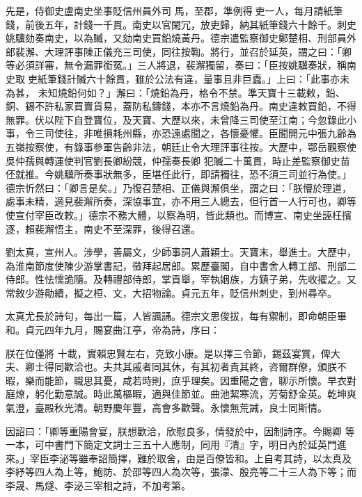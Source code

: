 \begin{pinyinscope}
 先是，侍御史盧南史坐事貶信州員外司
 馬，至郡，準例得吏一人，每月請紙筆錢，前後五年，計錢一千貫。南史以官閑冗，放吏歸，納其紙筆錢六十餘千。刺史姚驥劾奏南史，以為贓，又劾南史買鉛燒黃丹。德宗遣監察御史鄭楚相、刑部員外郎裴澥、大理評事陳正儀充三司使，同往按鞫。將行，並召於延英，謂之曰：「卿等必須詳審，無令漏罪銜冤。」三人將退，裴澥獨留，奏曰：「臣按姚驥奏狀，稱南史取吏紙筆錢計贓六十餘貫，雖於公法有違，量事且非巨蠹。」上曰：「此事亦未為甚，
 未知燒鉛何如？」澥曰：「燒鉛為丹，格令不禁。準天寶十三載敕，鉛、銅、錫不許私家買賣貨易，蓋防私鑄錢，本亦不言燒鉛為丹。南史違敕買鉛，不得無罪。伏以陛下自登寶位，及天寶、大歷以來，未曾降三司使至江南；今忽錄此小事，令三司使往，非唯損耗州縣，亦恐遠處聞之，各懷憂懼。臣聞開元中張九齡為五嶺按察使，有錄事參軍告齡非法，朝廷止令大理評事往按。大歷中，鄂岳觀察使吳仲孺與轉運使判官劉長卿紛競，仲孺奏長卿
 犯贓二十萬貫，時止差監察御史苗伾就推。今姚驥所奏事狀無多，臣堪任此行，即請獨往，恐不須三司並行為使。」德宗忻然曰：「卿言是矣。」乃復召楚相、正儀與澥俱坐，謂之曰：「朕懵於理道，處事未精，適見裴澥所奏，深協事宜，亦不用三人總去，但行首一人行可也，卿等使宣付宰臣改敕。」德宗不務大體，以察為明，皆此類也。而博宣、南史坐誣枉擯逐，賴裴澥悟主，南史不至深罪，後得召還。



 劉太真，宣州人。涉學，善屬文，少師事詞人蕭穎士。天寶末，舉進士。大歷中，為淮南節度使陳少游掌書記，徵拜起居郎。累歷臺閣，自中書舍人轉工部、刑部二侍郎。性怯懦詭隨。及轉禮部侍郎，掌貢舉，宰執姻族，方鎮子弟，先收擢之。又常敘少游勛績，擬之桓、文，大招物論。貞元五年，貶信州刺史，到州尋卒。



 太真尤長於詩句，每出一篇，人皆諷誦。德宗文思俊拔，每有禦制，即命朝臣畢和。貞元四年九月，賜宴曲江亭，帝為詩，序曰：



 朕在位僅將
 十載，實賴忠賢左右，克致小康。是以擇三令節，錫茲宴賞，俾大夫、卿士得同歡洽也。夫共其戚者同其休，有其初者貴其終，咨爾群僚，頒朕不暇，樂而能節，職思其憂，咸若時則，庶乎理矣。因重陽之會，聊示所懷。早衣對庭燎，躬化勤意誠。時此萬樞暇，適與佳節並。曲池絜寒流，芳菊舒金英。乾坤爽氣澄，臺殿秋光清。朝野慶年豐，高會多歡聲。永懷無荒誡，良士同斯情。



 因詔曰：「卿等重陽會宴，朕想歡洽，欣慰良多，情發於中，因制詩序。今賜卿
 等一本，可中書門下簡定文詞士三五十人應制，同用『清』字，明日內於延英門進來。」宰臣李泌等雖奉詔簡擇，難於取舍，由是百僚皆和。上自考其詩，以太真及李紓等四人為上等，鮑防、於邵等四人為次等，張濛、殷亮等二十三人為下等；而李晟、馬燧、李泌三宰相之詩，不加考第。




\end{pinyinscope}
